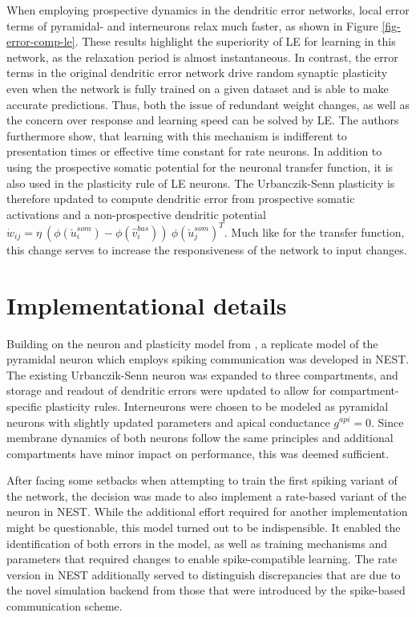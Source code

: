 When employing prospective dynamics in the dendritic error networks, local error terms of pyramidal- and interneurons
relax much faster, as shown in Figure \ref{fig-error-comp-le}. These results highlight the superiority of LE for
learning in this network, as the relaxation period is almost instantaneous. In contrast, the error terms in the original
dendritic error network drive random synaptic plasticity even when the network is fully trained on a given dataset and
is able to make accurate predictions. Thus, both the issue of redundant weight changes, as well as the concern over
response and learning speed can be solved by LE. The authors furthermore show, that learning with this mechanism is 
indifferent to presentation times or effective time constant for rate neurons.
In addition to using the prospective somatic potential for the neuronal transfer function, it is also used in the
plasticity rule of LE neurons. The Urbanczik-Senn plasticity is therefore updated to compute dendritic error from
prospective somatic activations and a non-prospective dendritic potential $\dot{w}_{ij}= \eta \ (
\phi(\breve{u}_i^{som}) - \phi(\hat{v}_i^{bas}) ) \ \phi(\breve{u}_j^{som})^T$. Much like for the transfer function,
this change serves to increase the responsiveness of the network to input changes.

\section{Implementational details}

Building on the neuron and plasticity model from \cite{Stapmanns2021}, a replicate model of the pyramidal neuron which
employs spiking communication was developed in NEST. The existing Urbanczik-Senn neuron was expanded to three
compartments, and storage and readout of dendritic errors were updated  to allow for compartment-specific plasticity
rules. Interneurons were chosen to be modeled as pyramidal neurons with slightly updated parameters and apical
conductance $g^{api}=0$. Since membrane dynamics of both neurons follow the same principles and additional compartments
have minor impact on performance, this was deemed sufficient.

After facing some setbacks when attempting to train the first spiking variant of the network, the decision was made to
also implement a rate-based variant of the neuron in NEST.  While the additional effort required for another
implementation might be questionable, this model turned out to be indispensible. It enabled the identification of both
errors in the model, as well as training mechanisms and parameters that required changes to enable spike-compatible
learning. The rate version in NEST additionally served to distinguish discrepancies that are due to the novel simulation
backend from those that were introduced by the spike-based communication scheme.

